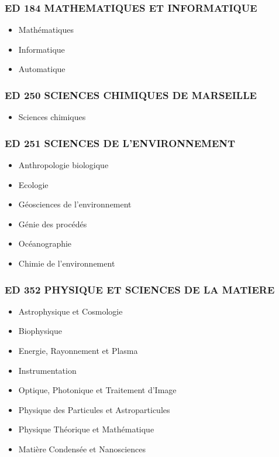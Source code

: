 \subsubsection*{ED 184 MATHEMATIQUES ET INFORMATIQUE}\label{ed-184-mathematiques-et-informatique}

\begin{itemize}
\item
  Mathématiques
\item
  Informatique
\item
  Automatique
\end{itemize}

\subsubsection*{ED 250 SCIENCES CHIMIQUES DE MARSEILLE}\label{ed-250-sciences-chimiques-de-marseille}

\begin{itemize}
\item
  Sciences chimiques
\end{itemize}

\subsubsection*{ED 251 SCIENCES DE L'ENVIRONNEMENT}\label{ed-251-sciences-de-lenvironnement}

\begin{itemize}
\item
  Anthropologie biologique
\item
  Ecologie
\item
  Géosciences de l'environnement
\item
  Génie des procédés
\item
  Océanographie
\item
  Chimie de l'environnement
\end{itemize}

\subsubsection*{ED 352 PHYSIQUE ET SCIENCES DE LA MATIERE}\label{ed-352-physique-et-sciences-de-la-matiere}

\begin{itemize}
\item
  Astrophysique et Cosmologie
\item
  Biophysique
\item
  Energie, Rayonnement et Plasma
\item
  Instrumentation
\item
  Optique, Photonique et Traitement d'Image
\item
  Physique des Particules et Astroparticules
\item
  Physique Théorique et Mathématique
\item
  Matière Condensée et Nanosciences
\end{itemize}

